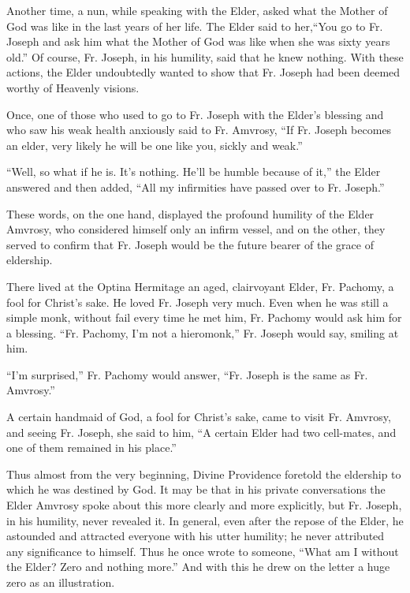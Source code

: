 Another time, a nun, while speaking with the Elder, asked what the Mother of God was like in the last years of her life. The Elder said to her,``You go to Fr. Joseph and ask him what the Mother of God was like when she was sixty years old.'' Of course, Fr. Joseph, in his humility, said that he knew nothing. With these actions, the Elder undoubtedly wanted to show that Fr. Joseph had been deemed worthy of Heavenly visions.

Once, one of those who used to go to Fr. Joseph with the Elder's blessing and who saw his weak health anxiously said to Fr. Amvrosy, ``If Fr. Joseph becomes an elder, very likely he will be one like you, sickly and weak.''

``Well, so what if he is. It's nothing. He'll be humble because of it,'' the Elder answered and then added, ``All my infirmities have passed over to Fr. Joseph.''

These words, on the one hand, displayed the profound humility of the Elder Amvrosy, who considered himself only an infirm vessel, and on the other, they served to confirm that Fr. Joseph would be the future bearer of the grace of eldership.

There lived at the Optina Hermitage an aged, clairvoyant Elder, Fr. Pachomy, a fool for Christ's sake. He loved Fr. Joseph very much. Even when he was still a simple monk, without fail every time he met him, Fr. Pachomy would ask him for a blessing. ``Fr. Pachomy, I'm not a hieromonk,'' Fr. Joseph would say, smiling at him.

``I'm surprised,'' Fr. Pachomy would answer, ``Fr. Joseph is the same as Fr. Amvrosy.''

\label{lady-before}A certain handmaid of God, a fool for Christ's sake, came to visit Fr. Amvrosy, and seeing Fr. Joseph, she said to him, ``A certain Elder had two cell-mates, and one of them remained in his place.''

Thus almost from the very beginning, Divine Providence foretold the eldership to which he was destined by God. It may be that in his private conversations the Elder Amvrosy spoke about this more clearly and more explicitly, but Fr. Joseph, in his humility, never revealed it. In general, even after the repose of the Elder, he astounded and attracted everyone with his utter humility; he never attributed any significance to himself. Thus he once wrote to someone, ``What am I without the Elder? Zero and nothing more.'' And with this he drew on the letter a huge zero as an illustration.

